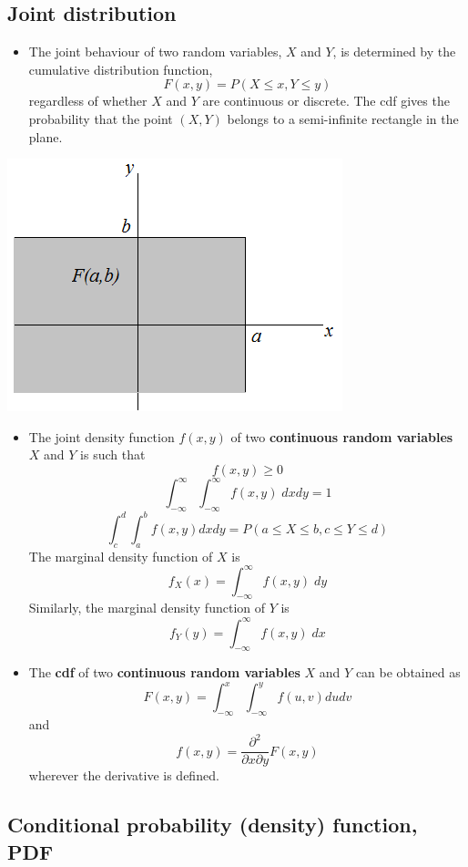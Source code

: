 \documentclass[
]{article}
\providecommand{\tightlist}{%
  \setlength{\itemsep}{0pt}\setlength{\parskip}{0pt}}
\begin{document}
\hypertarget{joint-distribution}{%
\subsection{Joint distribution}\label{joint-distribution}}

\begin{itemize}
\tightlist
\item
  The joint behaviour of two random variables, \(X\) and \(Y\), is
  determined by the cumulative distribution function,
  \[F(x,y)=P(X\leq x, Y \leq y)\] regardless of whether \(X\) and \(Y\)
  are continuous or discrete. The cdf gives the probability that the
  point \((X,Y)\) belongs to a semi-infinite rectangle in the plane.
\end{itemize}

\begin{center}\includegraphics[width=0.5\linewidth,height=0.5\textheight]{joint1} \end{center}

\begin{itemize}
\item
  The joint density function \(f(x,y)\) of two \textbf{continuous random
  variables} \(X\) and \(Y\) is such that \[f(x,y) \geq 0\]
  \[\int_{-\infty}^{\infty}\int_{-\infty}^{\infty}f(x,y)\;dxdy=1\]
  \[\int_{c}^{d}\int_{a}^{b}f(x,y)dxdy=P(a \leq X \leq b, c \leq Y \leq d )\]
  The marginal density function of \(X\) is
  \[f_X(x)=\int_{-\infty}^{\infty}f(x,y)\;dy\] Similarly, the marginal
  density function of \(Y\) is
  \[f_Y(y)=\int_{-\infty}^{\infty}f(x,y)\;dx\]
\item
  The \textbf{cdf} of two \textbf{continuous random variables} \(X\) and
  \(Y\) can be obtained as
  \[F(x,y)=\int_{-\infty}^{x}\int_{-\infty}^{y}f(u,v)dudv\] and
  \[f(x,y)=\frac{\partial^2}{\partial x \partial y}F(x,y)\] wherever the
  derivative is defined.
\end{itemize}

\hypertarget{conditional-probability-density-function-pdf}{%
\subsection{Conditional probability (density) function,
PDF}\label{conditional-probability-density-function-pdf}}
\end{document}
